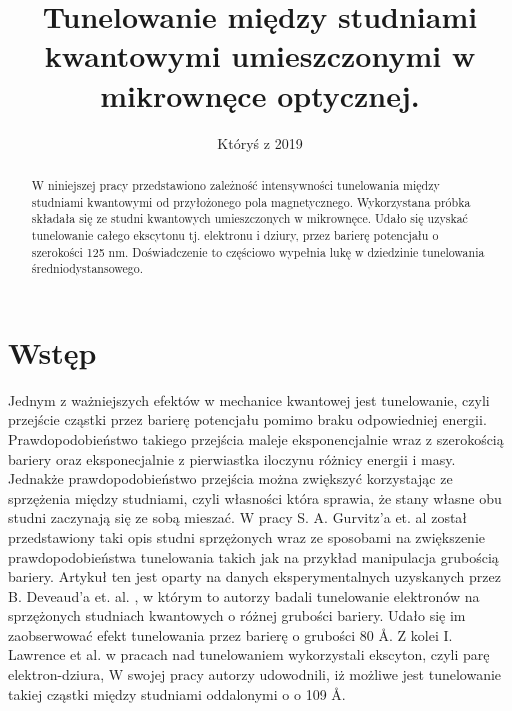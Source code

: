 \documentclass[licencjacka]{pracamgr}
\title{Tunelowanie między studniami kwantowymi umieszczonymi w mikrownęce optycznej.}
\date{Któryś z 2019}
\begin{document}
\maketitle

\begin{abstract}
  W niniejszej pracy przedstawiono zależność intensywności tunelowania między studniami kwantowymi od przyłożonego pola magnetycznego. Wykorzystana próbka składała się ze studni kwantowych umieszczonych w mikrownęce. Udało się uzyskać tunelowanie całego ekscytonu tj. elektronu i dziury, przez barierę potencjału o szerokości 125 nm. Doświadczenie to częściowo wypełnia lukę w dziedzinie tunelowania średniodystansowego.
\end{abstract}


\chapter*{Wstęp}
%
Jednym z ważniejszych efektów w mechanice kwantowej jest tunelowanie, czyli przejście cząstki przez barierę potencjału pomimo braku odpowiedniej energii. Prawdopodobieństwo takiego przejścia maleje eksponencjalnie wraz z szerokością bariery oraz eksponecjalnie z pierwiastka iloczynu różnicy energii i masy. %
 Jednakże prawdopodobieństwo przejścia można zwiększyć korzystając ze sprzężenia między studniami, czyli własności która sprawia, że stany własne obu studni zaczynają się ze sobą mieszać. W pracy S. A. Gurvitz'a et. al \cite{1991} został przedstawiony taki opis studni sprzężonych wraz ze sposobami na zwiększenie prawdopodobieństwa tunelowania takich jak na przykład manipulacja grubością bariery. Artykuł ten jest oparty na danych eksperymentalnych uzyskanych przez B. Deveaud'a et. al. \cite{1990}, w którym to autorzy badali tunelowanie elektronów na sprzężonych studniach kwantowych o różnej grubości bariery. Udało się im zaobserwować efekt tunelowania przez barierę o grubości 80 \r{A}.  Z kolei I. Lawrence et al. \cite{1994} w pracach nad tunelowaniem wykorzystali ekscyton, czyli parę elektron-dziura,%
  W swojej pracy autorzy udowodnili, iż możliwe jest tunelowanie takiej cząstki między studniami oddalonymi o o 109 \r{A}. %
\end{document}
